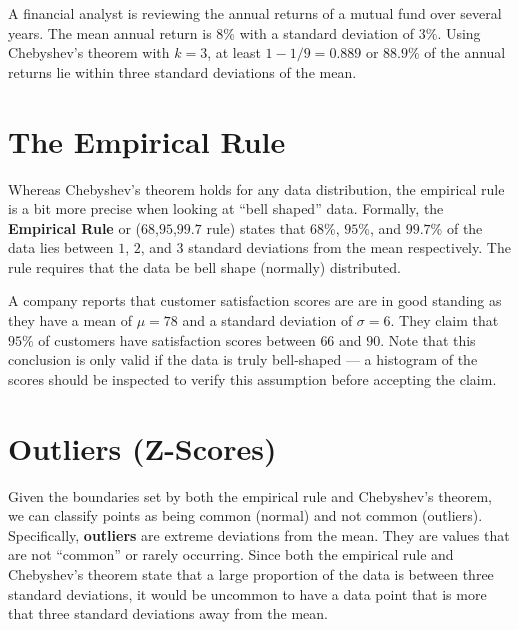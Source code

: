 \documentclass[
  11pt,
  letterpaper,
  DIV=11,
  numbers=noendperiod,
  oneside,
  open=any]{scrreprt}
\begin{document}
\begin{bsexample}[Example 2]

A financial analyst is reviewing the annual returns of a mutual fund
over several years. The mean annual return is \(8\%\) with a standard
deviation of \(3\%\). Using Chebyshev's theorem with \(k=3\), at least
\(1-1/9=0.889\) or \(88.9\%\) of the annual returns lie within three
standard deviations of the mean.

\end{bsexample}

\section{The Empirical Rule}\label{the-empirical-rule}

Whereas Chebyshev's theorem holds for any data distribution, the
empirical rule is a bit more precise when looking at ``bell shaped''
data. Formally, the \textbf{Empirical Rule} or (\(68\),\(95\),\(99.7\)
rule) states that \(68\)\%, \(95\)\%, and \(99.7\)\% of the data lies
between \(1\), \(2\), and \(3\) standard deviations from the mean
respectively. The rule requires that the data be bell shape (normally)
distributed.

\begin{bsexample}[Example]

A company reports that customer satisfaction scores are are in good
standing as they have a mean of \(\mu=78\) and a standard deviation of
\(\sigma=6\). They claim that \(95\%\) of customers have satisfaction
scores between \(66\) and \(90\). Note that this conclusion is only
valid if the data is truly bell-shaped --- a histogram of the scores
should be inspected to verify this assumption before accepting the
claim.

\end{bsexample}

\section{Outliers (Z-Scores)}\label{outliers-z-scores}

Given the boundaries set by both the empirical rule and Chebyshev's
theorem, we can classify points as being common (normal) and not common
(outliers). Specifically, \textbf{outliers} are extreme deviations from
the mean. They are values that are not ``common'' or rarely occurring.
Since both the empirical rule and Chebyshev's theorem state that a large
proportion of the data is between three standard deviations, it would be
uncommon to have a data point that is more that three standard
deviations away from the mean.
\end{document}
